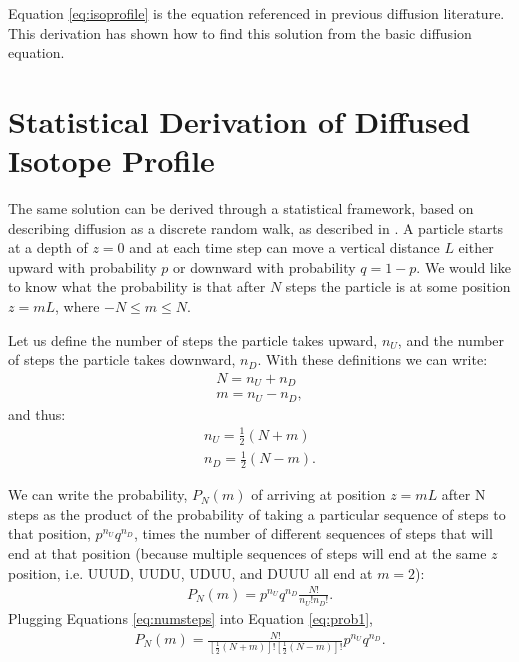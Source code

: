 \documentclass[draft, jgrga]{AGUTeX}
\begin{document}
\begin{article}
Equation \ref{eq:isoprofile} is the equation referenced in previous diffusion literature. This derivation has shown how to find this solution from the basic diffusion equation.

\section{Statistical Derivation of Diffused Isotope Profile}

The same solution can be derived through a statistical framework, based on describing diffusion as a discrete random walk, as described in \citet{Lasaga2014}. A particle starts at a depth of $z = 0$ and at each time step can move a vertical distance $L$ either upward with probability $p$ or downward with probability $q = 1-p$. We would like to know what the probability is that after $N$ steps the particle is at some position $z = mL$, where $-N \leq m \leq N$.

Let us define the number of steps the particle takes upward, $n_U$, and the number of steps the particle takes downward, $n_D$. With these definitions we can write:
\begin{eqnarray}
N = n_U + n_D \\
m = n_U - n_D,
\end{eqnarray}
and thus:
\begin{eqnarray}
n_U = \frac{1}{2} (N+m) \\
n_D = \frac{1}{2} (N-m). \label{eq:numsteps}
\end{eqnarray}

We can write the probability, $P_N(m)$ of arriving at position $z = mL$ after N steps as the product of the probability of taking a particular sequence of steps to that position, $p^{n_U} q^{n_D}$, times the number of different sequences of steps that will end at that position (because multiple sequences of steps will end at the same $z$ position, i.e. UUUD, UUDU, UDUU, and DUUU all end at $m=2$):
\begin{eqnarray}
  \label{eq:prob1}
P_N(m) = p^ {n_U} q^ {n_D} \frac{N!}{n_U! n_D!}.
\end{eqnarray}
Plugging Equations \ref{eq:numsteps} into Equation \ref{eq:prob1},
\begin{eqnarray}
  \label{eq:prob2}
P_N(m) = \frac{N!}{[\frac{1}{2}(N+m)]![\frac{1}{2}(N-m)]!} p^{n_U}q^{n_D}.
\end{eqnarray}


\end{article}
\end{document}
